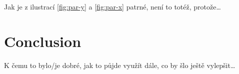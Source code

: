 \documentclass[english]{mvi-report}
\begin{document}
Jak je z ilustrací \ref{fig:par-y} a \ref{fig:par-x} patrné, není to totéž, protože\ldots


\section{Conclusion}
K čemu to bylo/je dobré, jak to půjde využít dále, co by šlo ještě vylepšit\ldots

\nocite{zizka}
%

\end{document}
